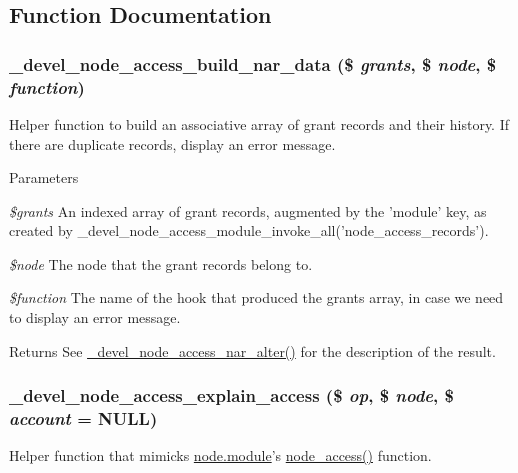 \subsection{Function Documentation}
\hypertarget{devel__node__access_8module_ac95e8f567bfc44a460680bd2d676faaa}{
\subsubsection[{\_\-devel\_\-node\_\-access\_\-build\_\-nar\_\-data}]{\setlength{\rightskip}{0pt plus 5cm}\_\-devel\_\-node\_\-access\_\-build\_\-nar\_\-data (\$ {\em grants}, \/  \$ {\em node}, \/  \$ {\em function})}}
\label{devel__node__access_8module_ac95e8f567bfc44a460680bd2d676faaa}
Helper function to build an associative array of grant records and their history. If there are duplicate records, display an error message.


\begin{DoxyParams}{Parameters}
\item[{\em \$grants}]An indexed array of grant records, augmented by the 'module' key, as created by \_\-devel\_\-node\_\-access\_\-module\_\-invoke\_\-all('node\_\-access\_\-records').\item[{\em \$node}]The node that the grant records belong to.\item[{\em \$function}]The name of the hook that produced the grants array, in case we need to display an error message.\end{DoxyParams}
\begin{DoxyReturn}{Returns}
See \hyperlink{devel__node__access_8module_a4e53f1761aae77265e0b5fecfef17875}{\_\-devel\_\-node\_\-access\_\-nar\_\-alter()} for the description of the result. 
\end{DoxyReturn}
\hypertarget{devel__node__access_8module_a4cb1e534842f4b1976d02c7cd0f9958d}{
\subsubsection[{\_\-devel\_\-node\_\-access\_\-explain\_\-access}]{\setlength{\rightskip}{0pt plus 5cm}\_\-devel\_\-node\_\-access\_\-explain\_\-access (\$ {\em op}, \/  \$ {\em node}, \/  \$ {\em account} = {\ttfamily NULL})}}
\label{devel__node__access_8module_a4cb1e534842f4b1976d02c7cd0f9958d}
Helper function that mimicks \hyperlink{node_8module}{node.module}'s \hyperlink{group__node__access_ga46f0f1ed812befada8f8e7d1b8c352db}{node\_\-access()} function.

